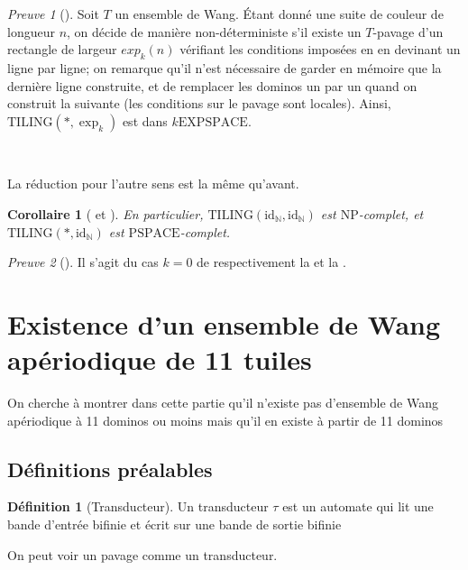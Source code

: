 \documentclass{scrartcl}
\newcommand{\N}{\mathbb N}
\newcommand{\id}{\mathrm{id}}
\newtheorem{corollaire}{Corollaire}
\theoremstyle{definition}
\newtheorem{definition}{Définition}
\theoremstyle{remark}
\newtheorem*{preuve}{Preuve}
\begin{document}
\begin{preuve}[]
  Soit $T$ un ensemble de Wang. Étant donné une suite de couleur de longueur $n$, on décide de manière non-déterministe s'il existe un $T$-pavage d'un rectangle de largeur $exp_k(n)$ vérifiant les conditions imposées en en devinant un ligne par ligne; on remarque qu'il n'est nécessaire de garder en mémoire que la dernière ligne construite, et de remplacer les dominos un par un quand on construit la suivante (les conditions sur le pavage sont locales). Ainsi, $\mathrm{TILING}(*,\exp_k)$ est dans $k\mathrm{EXPSPACE}$.

  \

  La réduction pour l'autre sens est la même qu'avant.
\end{preuve}

\begin{corollaire}[ et ]
  En particulier, $\mathrm{TILING}(\id_\N,\id_\N)$ est $\mathrm{NP}$-complet, et $\mathrm{TILING}(*,\id_\N)$ est $\mathrm{PSPACE}$-complet. 
\end{corollaire}

\begin{preuve}[]
  Il s'agit du cas $k=0$ de respectivement la  et la .
\end{preuve}

\section{Existence d'un ensemble de Wang apériodique de 11 tuiles}

On cherche à montrer dans cette partie qu'il n'existe pas d'ensemble de Wang apériodique à 11 dominos ou moins
mais qu'il en existe à partir de 11 dominos

\subsection{Définitions préalables}

\begin{definition}[Transducteur]
    
Un transducteur $\tau$ est un automate qui lit une bande d'entrée bifinie et écrit sur une bande de sortie bifinie

\end{definition}

On peut voir un pavage comme un transducteur.
\end{document}

